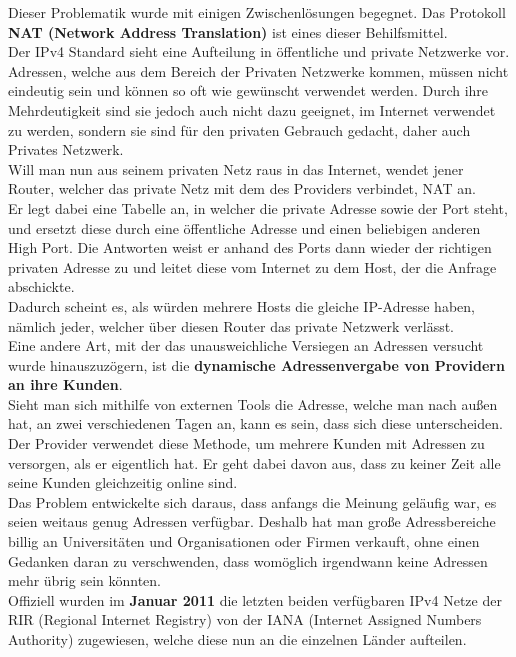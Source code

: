 \documentclass[12pt,a4paper]{report}
\begin{document}
Dieser Problematik wurde mit einigen Zwischenlösungen begegnet. Das Protokoll \textbf{NAT (Network Address Translation)} ist eines dieser Behilfsmittel.\\
Der IPv4 Standard sieht eine Aufteilung in öffentliche und private Netzwerke vor. Adressen, welche aus dem Bereich der Privaten Netzwerke kommen, müssen nicht eindeutig sein und können so oft wie gewünscht verwendet werden. Durch ihre Mehrdeutigkeit sind sie jedoch auch nicht dazu geeignet, im Internet verwendet zu werden, sondern sie sind für den privaten Gebrauch gedacht, daher auch Privates Netzwerk.\\
Will man nun aus seinem privaten Netz raus in das Internet, wendet jener Router, welcher das private Netz mit dem des Providers verbindet, NAT an.\\
Er legt dabei eine Tabelle an, in welcher die private Adresse sowie der Port steht, und ersetzt diese durch eine öffentliche Adresse und einen beliebigen anderen High Port. Die Antworten weist er anhand des Ports dann wieder der richtigen privaten Adresse zu und leitet diese vom Internet zu dem Host, der die Anfrage abschickte.\\
Dadurch scheint es, als würden mehrere Hosts die gleiche IP-Adresse haben, nämlich jeder, welcher über diesen Router das private Netzwerk verlässt.\\

Eine andere Art, mit der das unausweichliche Versiegen an Adressen versucht wurde hinauszuzögern, ist die \textbf{dynamische Adressenvergabe von Providern an ihre Kunden}.\\
Sieht man sich mithilfe von externen Tools die Adresse, welche man nach außen hat, an zwei verschiedenen Tagen an, kann es sein, dass sich diese unterscheiden.\\
Der Provider verwendet diese Methode, um mehrere Kunden mit Adressen zu versorgen, als er eigentlich hat. Er geht dabei davon aus, dass zu keiner Zeit alle seine Kunden gleichzeitig online sind.\\

Das Problem entwickelte sich daraus, dass anfangs die Meinung geläufig war, es seien weitaus genug Adressen verfügbar. Deshalb hat man große Adressbereiche billig an Universitäten und Organisationen oder Firmen verkauft, ohne einen Gedanken daran zu verschwenden, dass womöglich irgendwann keine Adressen mehr übrig sein könnten.\\
Offiziell wurden im \textbf{Januar 2011} die letzten beiden verfügbaren IPv4 Netze der RIR (Regional Internet Registry) von der IANA (Internet Assigned Numbers Authority) zugewiesen, welche diese nun an die einzelnen Länder aufteilen.\\
\end{document}
